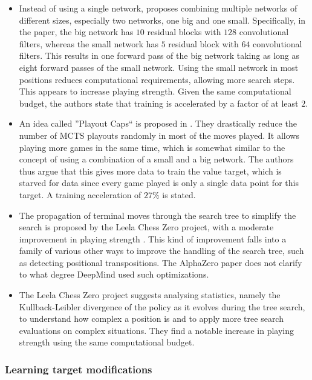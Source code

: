 \documentclass[12pt,onecolumn,oneside,titlepage]{article}
\begin{document}
\begin{itemize}
 \item Instead of using a single network, \cite{lan2019multiple} proposes combining multiple networks of different sizes, especially two networks, one big and one small. Specifically, in the paper, the 
 big network has $10$ residual blocks with $128$ convolutional filters, whereas the small network has $5$ residual block with $64$ convolutional filters. 
 This results in one forward pass of the big network taking as long as eight forward passes of the small network.
 Using the small network in most positions reduces computational requirements, 
 allowing more search steps. This appears to increase playing strength. Given the same computational budget, the authors state that training is accelerated by a factor of at least $2$.
 \item An idea called ''Playout Caps`` is proposed in \cite{wu2019accelerating}. They drastically reduce the number of MCTS playouts randomly in most of the moves played. 
 It allows playing more games in the same time, which is somewhat similar to 
 the concept of using a combination of a small and a big network. 
 The authors thus argue that this gives more data to train the value target, which is starved for data since every game played is only a single data point for this target. A training acceleration of $27\%$ is stated.
 \item The propagation of terminal moves through the search tree to simplify the search is proposed by the Leela Chess Zero project, with a moderate improvement in playing strength \cite{leela0propagation}. This kind of improvement falls
 into a family of various other ways to improve the handling of the search tree, such as detecting positional transpositions. The AlphaZero paper does not clarify to what degree DeepMind used such optimizations.
 \item The Leela Chess Zero project suggests analysing statistics, namely the Kullback-Leibler divergence of the policy as it evolves during the tree search, 
 to understand how complex a position is and to apply more tree search evaluations on complex situations. They find a notable increase
   in playing strength \cite{leela0kldgain} using the same computational budget.
\end{itemize}

\subsubsection{Learning target modifications}
\end{document}
